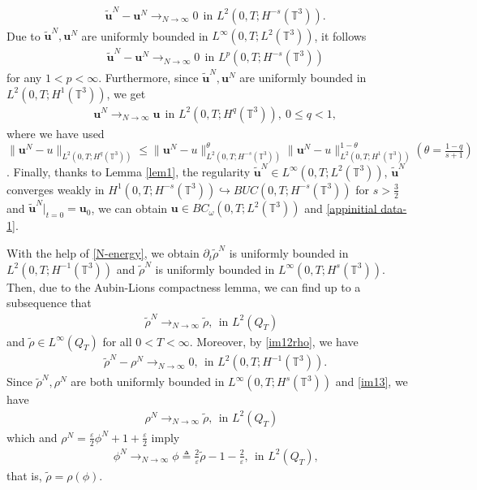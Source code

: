 \documentclass[reqno,a4paper,11pt]{amsart}
\theoremstyle{plain}
\numberwithin{equation}{section}
\newcommand{\bu}{\mathbf{u}}
\begin{document}
\begin{align*}
	& \widetilde{\mathbf{u}}^{N}-\mathbf{u}^{N}\rightarrow_{N\rightarrow\infty}0 \ \  \text{in  $L^{2}(0,T; H^{-s}(\mathbb{T}^{3}))$}.
\end{align*}
Due to $\widetilde{\mathbf{u}}^{N},\mathbf{u}^{N}$ are uniformly bounded in $L^{\infty}(0,T;  L^{2}(\mathbb{T}^{3}))$, it follows
\begin{align*}
	& \widetilde{\mathbf{u}}^{N}-\mathbf{u}^{N}\rightarrow_{N\rightarrow\infty}0 \ \  \text{in  $L^{p}(0,T; H^{-s}(\mathbb{T}^{3}))$}
\end{align*}
for any $1<p<\infty$. Furthermore, since  $\widetilde{\mathbf{u}}^{N},\mathbf{u}^{N}$ are uniformly bounded in $L^{2}(0,T;  H^{1}(\mathbb{T}^{3}))$, we get
\begin{align}\label{Strong convergence 1}
	& \mathbf{u}^{N}\rightarrow_{N\rightarrow\infty}\mathbf{u}\ \  \text{in  $L^{2}(0,T; H^{q}(\mathbb{T}^{3}))$},\ 0\leq q<1,
\end{align}
where we have used $\|\bu^{N}-u\|_{L^{2}(0,T;H^{q}(\mathbb{T}^{3}))}\leq \|\bu^{N}-u\|_{L^{2}(0,T;H^{-s}(\mathbb{T}^{3}))}^{\theta}\|\bu^{N}-u\|_{L^{2}(0,T;H^{1}(\mathbb{T}^{3}))}^{1-\theta}(\theta=\frac{1-q}{s+1})$. Finally, thanks to Lemma \ref{lem1}, the regularity $\widetilde{\mathbf{u}}^{N}\in L^{\infty}(0,T;  L^{2}(\mathbb{T}^{3}))$, $\widetilde{\mathbf{u}}^{N}$ converges weakly in $H^{1}(0,T; H^{-s}(\mathbb{T}^{3}))\hookrightarrow BUC(0,T; H^{-s}(\mathbb{T}^{3}))$ for $s>\frac{3}{2}$ and $\widetilde{\mathbf{u}}^{N}|_{t=0}=\mathbf{u}_{0}$, we can obtain $\mathbf{u}\in BC_{\omega}(0,T;  L^{2}(\mathbb{T}^{3}))$ and \eqref{appinitial data-1}.

With the help of \eqref{N-energy}, we obtain $\partial_{t}\widetilde{\rho}^{N}$ is uniformly bounded in $L^{2}(0,T;H^{-1}(\mathbb{T}^{3}))$ and $\widetilde{\rho}^{N}$ is uniformly bounded in $L^{\infty}(0,T;  H^{s}(\mathbb{T}^{3}))$. Then, due to the Aubin-Lions compactness lemma, we can find up to a subsequence that
\begin{align}\label{im13}
	& \widetilde{\rho}^{N}\rightarrow _{N\rightarrow\infty}  \widetilde{\rho}, \ \  \text{in  $L^{2}(Q_{T})$ }
\end{align}
and  $\widetilde{\rho}\in L^{\infty}(Q_{T})$ for all $0<T<\infty$.  Moreover, by \eqref{im12rho}, we have
\begin{align*}
	& \widetilde{\rho}^{N}-\rho^{N}\rightarrow _{N\rightarrow\infty} 0  , \ \  \text{in  $L^{2}(0,T;H^{-1}(\mathbb{T}^{3}))$.}
\end{align*}
Since $\widetilde{\rho}^{N}, \rho^{N}$ are both uniformly bounded in $L^{\infty}(0,T;  H^{s}(\mathbb{T}^{3}))$ and \eqref{im13}, we have
\begin{align*}
	& \rho^{N}\rightarrow _{N\rightarrow\infty}  \widetilde{\rho}, \ \  \text{in  $L^{2}(Q_{T})$ }
\end{align*}
which and  $\rho^{N}=\frac{\varepsilon}{2}\phi^{N}+1+\frac{\varepsilon}{2}$ imply
\begin{align*}
	& \phi^{N}\rightarrow _{N\rightarrow\infty}  \phi\triangleq \frac{2}{\varepsilon}\widetilde{\rho}-1-\frac{2}{\varepsilon}, \ \  \text{in  $L^{2}(Q_{T})$,}
\end{align*}
that is,  $\widetilde{\rho}=\rho(\phi)$.
\end{document}
